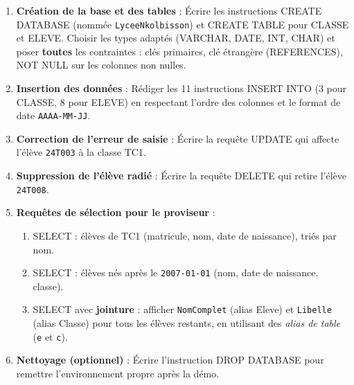 \documentclass[11pt]{article}
\newcommand{\cle}[1]{{\popxbold\color{popdark}#1}}
\begin{document}
\begin{enumerate}
    \item \textbf{Création de la base et des tables} : Écrire les instructions \cle{CREATE DATABASE} (nommée \texttt{LyceeNkolbisson}) et \cle{CREATE TABLE} pour \cle{CLASSE} et \cle{ELEVE}. Choisir les types adaptés (\cle{VARCHAR}, \cle{DATE}, \cle{INT}, \cle{CHAR}) et poser \textbf{toutes} les contraintes : clés primaires, clé étrangère (\cle{REFERENCES}), \cle{NOT NULL} sur les colonnes non nulles.
    \item \textbf{Insertion des données} : Rédiger les 11 instructions \cle{INSERT INTO} (3 pour \cle{CLASSE}, 8 pour \cle{ELEVE}) en respectant l'ordre des colonnes et le format de date \texttt{AAAA-MM-JJ}.
    \item \textbf{Correction de l'erreur de saisie} : Écrire la requête \cle{UPDATE} qui affecte l'élève \texttt{24T003} à la classe \cle{TC1}.
    \item \textbf{Suppression de l'élève radié} : Écrire la requête \cle{DELETE} qui retire l'élève \texttt{24T008}.
    \item \textbf{Requêtes de sélection pour le proviseur} :
    \begin{enumerate}
        \item \cle{SELECT} : élèves de \cle{TC1} (matricule, nom, date de naissance), triés par nom.
        \item \cle{SELECT} : élèves nés après le \texttt{2007-01-01} (nom, date de naissance, classe).
        \item \cle{SELECT} avec \textbf{jointure} : afficher \texttt{NomComplet} (alias \cle{Eleve}) et \texttt{Libelle} (alias \cle{Classe}) pour tous les élèves restants, en utilisant des \emph{alias de table} (\texttt{e} et \texttt{c}).
    \end{enumerate}
    \item \textbf{Nettoyage (optionnel)} : Écrire l'instruction \cle{DROP DATABASE} pour remettre l'environnement propre après la démo.
\end{enumerate}
\end{document}

